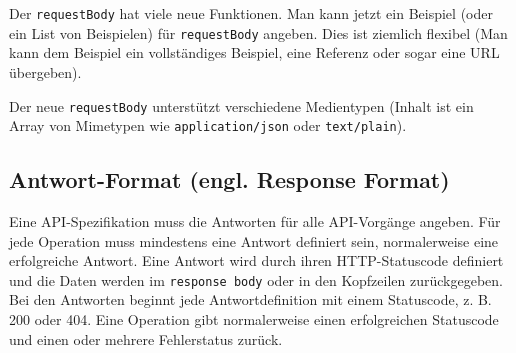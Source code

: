 Der \texttt{requestBody} hat viele neue Funktionen. Man kann jetzt ein Beispiel (oder ein List von Beispielen) für \texttt{requestBody} angeben. Dies ist ziemlich flexibel (Man kann dem Beispiel ein vollständiges Beispiel, eine Referenz oder sogar eine URL übergeben).

Der neue \texttt{requestBody} unterstützt verschiedene Medientypen (Inhalt ist ein Array von Mimetypen wie \texttt{application/json} oder \texttt{text/plain}).

\subsection{Antwort-Format (engl. Response Format)}

Eine API-Spezifikation muss die Antworten für alle API-Vorgänge angeben. Für jede Operation muss mindestens eine Antwort definiert sein, normalerweise eine erfolgreiche Antwort. Eine Antwort wird durch ihren HTTP-Statuscode definiert und die Daten werden im \texttt{response body} oder in den Kopfzeilen zurückgegeben. Bei den Antworten beginnt jede Antwortdefinition mit einem Statuscode, z. B. 200 oder 404. Eine Operation gibt normalerweise einen erfolgreichen Statuscode und einen oder mehrere Fehlerstatus zurück\cite{openapirequestbody17}.














 






































